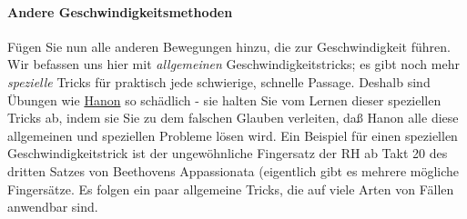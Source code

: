 \paragraph{Andere Geschwindigkeitsmethoden}
\label{c1iii7iAndere}

Fügen Sie nun alle anderen Bewegungen hinzu, die zur Geschwindigkeit führen.
Wir befassen uns hier mit \textit{allgemeinen} Geschwindigkeitstricks; es gibt noch mehr \textit{spezielle} Tricks für praktisch jede schwierige, schnelle Passage.
Deshalb sind Übungen wie \hyperref[c1iii7h]{Hanon} so schädlich - sie halten Sie vom Lernen dieser speziellen Tricks ab, indem sie Sie zu dem falschen Glauben verleiten, daß Hanon alle diese allgemeinen und speziellen Probleme lösen wird.
Ein Beispiel für einen speziellen Geschwindigkeitstrick ist der ungewöhnliche Fingersatz der RH ab Takt 20 des dritten Satzes von Beethovens Appassionata (eigentlich gibt es mehrere mögliche Fingersätze.
Es folgen ein paar allgemeine Tricks, die auf viele Arten von Fällen anwendbar sind.

